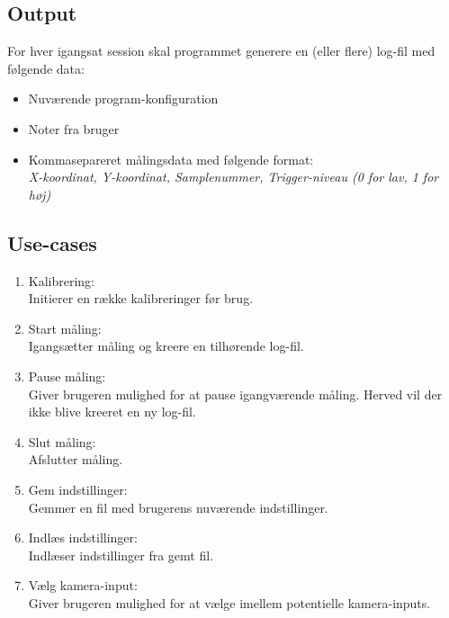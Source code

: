 \documentclass[kravspec.tex]{subfiles}
\begin{document}
\subsection{Output}
For hver igangsat session skal programmet generere en (eller flere) log-fil med følgende data:
\indent \begin{itemize}
	\item Nuværende program-konfiguration
	\item Noter fra bruger
	\item 	Kommasepareret målingsdata med følgende format: \\
	\textit{X-koordinat, Y-koordinat, Samplenummer, Trigger-niveau (0 for lav, 1 for høj)} 
\end{itemize}

\subsection{Use-cases}	
\label{usec}
\begin{enumerate}
	\item Kalibrering: \\Initierer en række kalibreringer før brug. 
	\item Start måling: \\Igangsætter måling og kreere en tilhørende log-fil.
	\item Pause måling: \\Giver brugeren mulighed for at pause igangværende måling. Herved vil der ikke blive kreeret en ny log-fil. 
	\item Slut måling: \\Afslutter måling.
	\item Gem indstillinger: \\Gemmer en fil med brugerens nuværende indstillinger.
	\item Indlæs indstillinger: \\Indlæser indstillinger fra gemt fil.
	\item Vælg kamera-input: \\ Giver brugeren mulighed for at vælge imellem potentielle kamera-inputs.
\end{enumerate}
\end{document}
